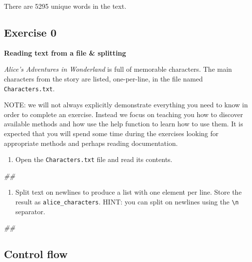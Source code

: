 \documentclass[
]{book}
\newenvironment{Shaded}{\begin{snugshade}}{\end{snugshade}}
\newcommand{\CommentTok}[1]{\textcolor[rgb]{0.56,0.35,0.01}{\textit{#1}}}
\providecommand{\tightlist}{%
  \setlength{\itemsep}{0pt}\setlength{\parskip}{0pt}}
\begin{document}
There are 5295 unique words in the text.

\hypertarget{exercise-0-3}{%
\subsection{Exercise 0}\label{exercise-0-3}}

\textbf{Reading text from a file \& splitting}

\emph{Alice's Adventures in Wonderland} is full of memorable characters. The main characters from the story are listed, one-per-line, in the file named \texttt{Characters.txt}.

NOTE: we will not always explicitly demonstrate everything you need to know in order to complete an exercise. Instead we focus on teaching you how to discover available methods and how use the help function to learn how to use them. It is expected that you will spend some time during the exercises looking for appropriate methods and perhaps reading documentation.

\begin{enumerate}
\def\labelenumi{\arabic{enumi}.}
\tightlist
\item
  Open the \texttt{Characters.txt} file and read its contents.
\end{enumerate}

\begin{Shaded}
\begin{Highlighting}[]
\CommentTok{##}
\end{Highlighting}
\end{Shaded}

\begin{enumerate}
\def\labelenumi{\arabic{enumi}.}
\setcounter{enumi}{1}
\tightlist
\item
  Split text on newlines to produce a list with one element per line. Store the result as \texttt{alice\_characters}. HINT: you can split on newlines using the \texttt{\textbackslash{}n} separator.
\end{enumerate}

\begin{Shaded}
\begin{Highlighting}[]
\CommentTok{##}
\end{Highlighting}
\end{Shaded}

\hypertarget{control-flow}{%
\subsection{Control flow}\label{control-flow}}
\end{document}
